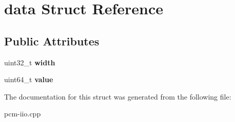 \hypertarget{structdata}{}\section{data Struct Reference}
\label{structdata}
\subsection*{Public Attributes}
\begin{DoxyCompactItemize}
\item 
\mbox{\label{structdata_a751af8cd5c196a997cf47c8e3c95802c}} 
uint32\+\_\+t {\bfseries width}
\item 
\mbox{\label{structdata_aee26865f2660705b3461088f8946f54c}} 
uint64\+\_\+t {\bfseries value}
\end{DoxyCompactItemize}


The documentation for this struct was generated from the following file\+:\begin{DoxyCompactItemize}
\item 
pcm-\/iio.\+cpp\end{DoxyCompactItemize}
